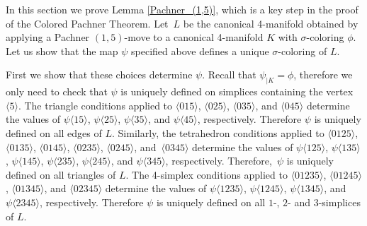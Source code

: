 \documentclass[a4paper, oneside]{amsart}
\numberwithin{equation}{subsection}
\theoremstyle{referencedlemma}
\theoremstyle{plain} %
\theoremstyle{remark}
\begin{document}
\noindent In this section we prove Lemma \ref{Pachner_(1,5)}, which is a key step in the proof of the Colored Pachner Theorem. Let~$L$ be the canonical 4-manifold obtained by applying a Pachner $(1,5)$-move to a canonical 4-manifold $K$ with $\sigma$-coloring $\phi$.  Let us show that the map $\psi$ specified above defines a unique $\sigma$-coloring of $L$. 

First we show that these choices determine $\psi$. Recall that $\psi_{\vert K} = \phi$, therefore we only need to check that $\psi$ is uniquely defined on simplices containing the vertex $\langle 5\rangle$. The triangle conditions applied to $\langle 015\rangle$, $\langle 025\rangle$, $\langle 035\rangle$, and $\langle 045\rangle$ determine the values of $\psi\langle 15\rangle$, $\psi\langle 25\rangle$, $\psi\langle 35\rangle$, and $\psi\langle 45\rangle$, respectively. Therefore $\psi$ is uniquely defined on all edges of $L$.  Similarly, the tetrahedron conditions applied to $\langle 0125\rangle$, $\langle 0135\rangle$, $\langle 0145\rangle$, $\langle 0235\rangle $,  $\langle 0245\rangle$,  and~$\langle 0345\rangle $ determine the values of $\psi\langle 125\rangle$,  $ \psi\langle 135\rangle$,  $ \psi\langle 145\rangle$, $\psi\langle 235\rangle $,  $\psi\langle 245\rangle$, and $\psi\langle 345\rangle$, respectively.  Therefore,~$\psi$ is uniquely defined on all triangles of $L$.  The 4-simplex conditions applied to $\langle 01235\rangle$, $\langle 01245\rangle$, $\langle 01345\rangle$, and $\langle 02345\rangle$ determine the values of $\psi\langle 1235\rangle$, $\psi\langle 1245\rangle$, $\psi\langle 1345\rangle$, and $\psi\langle 2345\rangle$, respectively. Therefore $\psi$ is uniquely defined on all $1$-, $2$- and $3$-simplices of $L$. 
\end{document}
